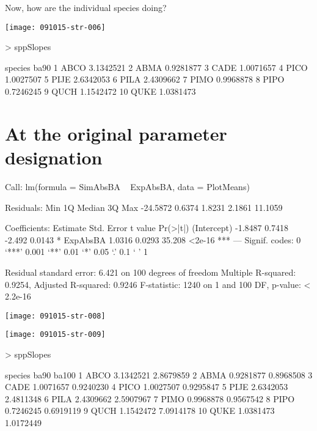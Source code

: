 \documentclass{article}
\begin{document}
Now, how are the individual species doing?

\texttt{[image: 091015-str-006]}
\begin{Schunk}
\begin{Sinput}
>   sppSlopes
\end{Sinput}
\begin{Soutput}
   species      ba90
1     ABCO 3.1342521
2     ABMA 0.9281877
3     CADE 1.0071657
4     PICO 1.0027507
5     PIJE 2.6342053
6     PILA 2.4309662
7     PIMO 0.9968878
8     PIPO 0.7246245
9     QUCH 1.1542472
10    QUKE 1.0381473
\end{Soutput}
\end{Schunk}


\newpage
\section{At the original parameter designation}
\begin{Schunk}
\begin{Soutput}
Call:
lm(formula = SimAbsBA ~ ExpAbsBA, data = PlotMeans)

Residuals:
     Min       1Q   Median       3Q      Max 
-24.5872   0.6374   1.8231   2.1861  11.1059 

Coefficients:
            Estimate Std. Error t value Pr(>|t|)    
(Intercept)  -1.8487     0.7418  -2.492   0.0143 *  
ExpAbsBA      1.0316     0.0293  35.208   <2e-16 ***
---
Signif. codes:  0 ‘***’ 0.001 ‘**’ 0.01 ‘*’ 0.05 ‘.’ 0.1 ‘ ’ 1

Residual standard error: 6.421 on 100 degrees of freedom
Multiple R-squared:  0.9254,	Adjusted R-squared:  0.9246 
F-statistic:  1240 on 1 and 100 DF,  p-value: < 2.2e-16
\end{Soutput}
\end{Schunk}
\texttt{[image: 091015-str-008]}

\texttt{[image: 091015-str-009]}
\begin{Schunk}
\begin{Sinput}
>   sppSlopes
\end{Sinput}
\begin{Soutput}
   species      ba90     ba100
1     ABCO 3.1342521 2.8679859
2     ABMA 0.9281877 0.8968508
3     CADE 1.0071657 0.9240230
4     PICO 1.0027507 0.9295847
5     PIJE 2.6342053 2.4811348
6     PILA 2.4309662 2.5907967
7     PIMO 0.9968878 0.9567542
8     PIPO 0.7246245 0.6919119
9     QUCH 1.1542472 7.0914178
10    QUKE 1.0381473 1.0172449
\end{Soutput}
\end{Schunk}
\end{document}
